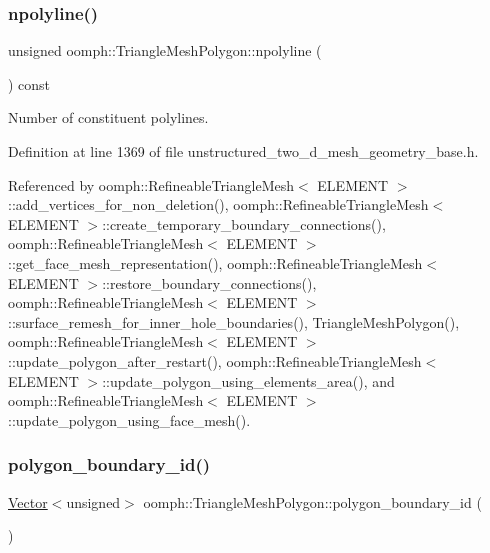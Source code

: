 \subsubsection{\texorpdfstring{npolyline()}{npolyline()}}
{\footnotesize\ttfamily unsigned oomph\+::\+Triangle\+Mesh\+Polygon\+::npolyline (\begin{DoxyParamCaption}{ }\end{DoxyParamCaption}) const\hspace{0.3cm}{\ttfamily [inline]}}



Number of constituent polylines. 



Definition at line 1369 of file unstructured\+\_\+two\+\_\+d\+\_\+mesh\+\_\+geometry\+\_\+base.\+h.



Referenced by oomph\+::\+Refineable\+Triangle\+Mesh$<$ E\+L\+E\+M\+E\+N\+T $>$\+::add\+\_\+vertices\+\_\+for\+\_\+non\+\_\+deletion(), oomph\+::\+Refineable\+Triangle\+Mesh$<$ E\+L\+E\+M\+E\+N\+T $>$\+::create\+\_\+temporary\+\_\+boundary\+\_\+connections(), oomph\+::\+Refineable\+Triangle\+Mesh$<$ E\+L\+E\+M\+E\+N\+T $>$\+::get\+\_\+face\+\_\+mesh\+\_\+representation(), oomph\+::\+Refineable\+Triangle\+Mesh$<$ E\+L\+E\+M\+E\+N\+T $>$\+::restore\+\_\+boundary\+\_\+connections(), oomph\+::\+Refineable\+Triangle\+Mesh$<$ E\+L\+E\+M\+E\+N\+T $>$\+::surface\+\_\+remesh\+\_\+for\+\_\+inner\+\_\+hole\+\_\+boundaries(), Triangle\+Mesh\+Polygon(), oomph\+::\+Refineable\+Triangle\+Mesh$<$ E\+L\+E\+M\+E\+N\+T $>$\+::update\+\_\+polygon\+\_\+after\+\_\+restart(), oomph\+::\+Refineable\+Triangle\+Mesh$<$ E\+L\+E\+M\+E\+N\+T $>$\+::update\+\_\+polygon\+\_\+using\+\_\+elements\+\_\+area(), and oomph\+::\+Refineable\+Triangle\+Mesh$<$ E\+L\+E\+M\+E\+N\+T $>$\+::update\+\_\+polygon\+\_\+using\+\_\+face\+\_\+mesh().

\mbox{\label{classoomph_1_1TriangleMeshPolygon_a3d252deb06cbe9e6a48b55218b9dde2e}} 
\subsubsection{\texorpdfstring{polygon\+\_\+boundary\+\_\+id()}{polygon\_boundary\_id()}}
{\footnotesize\ttfamily \hyperlink{classoomph_1_1Vector}{Vector}$<$unsigned$>$ oomph\+::\+Triangle\+Mesh\+Polygon\+::polygon\+\_\+boundary\+\_\+id (\begin{DoxyParamCaption}{ }\end{DoxyParamCaption})\hspace{0.3cm}{\ttfamily [inline]}}




